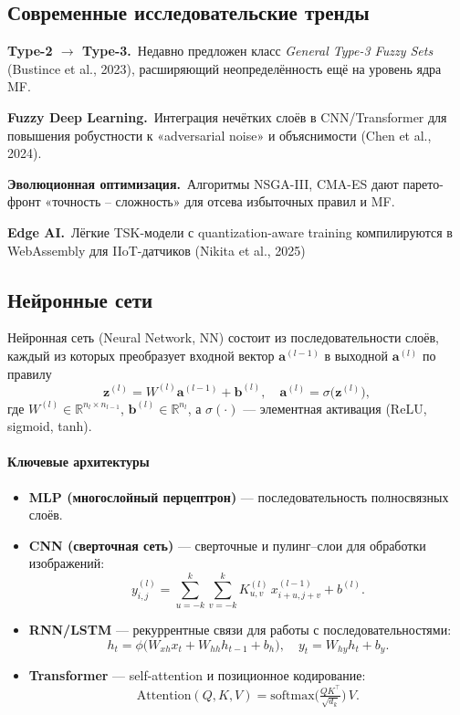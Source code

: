 \subsection{Современные исследовательские тренды}
\label{subsec:trends}

\textbf{Type-2 $\to$ Type-3.}\,
Недавно предложен класс \emph{General Type-3 Fuzzy Sets}
(Bustince et al., 2023), расширяющий неопределённость
ещё на уровень ядра MF.

\textbf{Fuzzy Deep Learning.}\,
Интеграция нечётких слоёв в CNN/Transformer
для повышения робустности к «adversarial noise»
и объяснимости
(Chen et al., 2024).

\textbf{Эволюционная оптимизация.}\,
Алгоритмы NSGA-III, CMA-ES
дают парето-фронт «точность – сложность»
для отсева избыточных правил и MF.

\textbf{Edge AI.}\,
Лёгкие TSK-модели с quantization-aware training
компилируются в WebAssembly
для IIoT-датчиков (Nikita et al., 2025)

\subsection{Нейронные сети}
\label{subsec:neural_nets}

Нейронная сеть (Neural Network, NN) состоит из последовательности слоёв,
каждый из которых преобразует входной вектор $\mathbf{a}^{(l-1)}$ в
выходной $\mathbf{a}^{(l)}$ по правилу
\begin{equation}
  \mathbf{z}^{(l)} = W^{(l)}\mathbf{a}^{(l-1)} + \mathbf{b}^{(l)}, 
  \quad
  \mathbf{a}^{(l)} = \sigma\bigl(\mathbf{z}^{(l)}\bigr),
  \label{eq:nn_forward_full}
\end{equation}
где $W^{(l)}\in\mathbb{R}^{n_l\times n_{l-1}}$, 
$\mathbf{b}^{(l)}\in\mathbb{R}^{n_l}$,
а $\sigma(\cdot)$ — элементная активация (ReLU, sigmoid, tanh).

\paragraph{Ключевые архитектуры}
\begin{itemize}
  \item \textbf{MLP (многослойный перцептрон)} — последовательность полносвязных слоёв.
  \item \textbf{CNN (сверточная сеть)} — сверточные и пулинг–слои для обработки изображений:
    \[
      y_{i,j}^{(l)} = \sum_{u=-k}^k\sum_{v=-k}^k
      K_{u,v}^{(l)}\,x_{i+u,j+v}^{(l-1)} + b^{(l)}.
      \label{eq:cnn_full}
    \]
  \item \textbf{RNN/LSTM} — рекуррентные связи для работы с последовательностями:
    \begin{equation}
      h_t = \phi\bigl(W_{xh}x_t + W_{hh}h_{t-1} + b_h\bigr),
      \quad
      y_t = W_{hy}h_t + b_y.
      \label{eq:rnn_full}
    \end{equation}
  \item \textbf{Transformer} — self-attention и позиционное кодирование:
    \[
      \mathrm{Attention}(Q,K,V) = \mathrm{softmax}\!\bigl(\tfrac{QK^\top}{\sqrt{d_k}}\bigr)\,V.
      \label{eq:attention_full}
    \]
\end{itemize}

